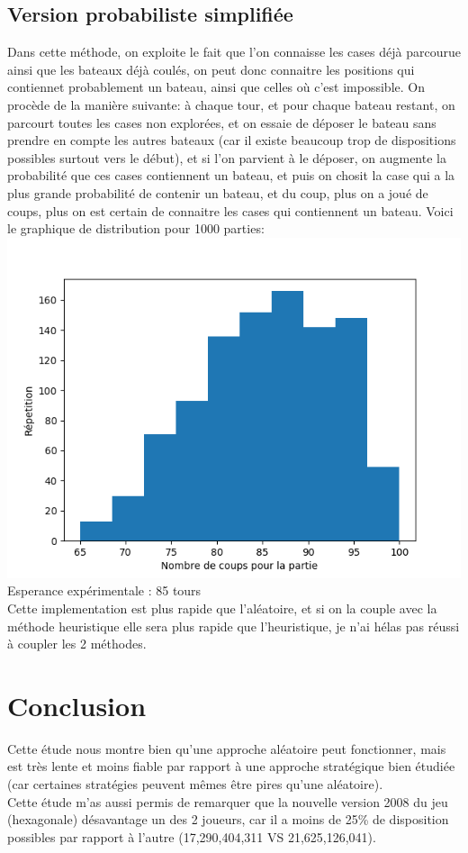 \documentclass[12pt]{article}
\begin{document}
    \subsection{Version probabiliste simplifiée}
    Dans cette méthode, on exploite le fait que l'on connaisse les cases déjà parcourue ainsi que les bateaux déjà coulés, on peut donc connaitre les positions qui contiennet probablement un bateau, ainsi que celles où c'est impossible.
    On procède de la manière suivante: à chaque tour, et pour chaque bateau restant, on parcourt toutes les cases non explorées, et on essaie de déposer le bateau sans prendre en compte les autres bateaux (car il existe beaucoup trop de dispositions possibles surtout vers le début), et si l'on parvient à le déposer, on augmente la probabilité que ces cases contiennent un bateau, et puis on chosit la case qui a la plus grande probabilité de contenir un bateau, et du coup, plus on a joué de coups, plus on est certain de connaitre les cases qui contiennent un bateau.
    Voici le graphique de distribution pour 1000 parties: \\
    \includegraphics{Proba.png}            
    \\Esperance expérimentale : 85 tours \\
    Cette implementation est plus rapide que l'aléatoire, et si on la couple avec la méthode heuristique elle sera plus rapide que l'heuristique, je n'ai hélas pas réussi à coupler les 2 méthodes.

\section{Conclusion}
    Cette étude nous montre bien qu'une approche aléatoire peut fonctionner, mais est très lente et moins fiable par rapport à une approche stratégique bien étudiée (car certaines stratégies peuvent mêmes être pires qu'une aléatoire).
    \\Cette étude m'as aussi permis de remarquer que la nouvelle version 2008 du jeu (hexagonale) désavantage un des 2 joueurs, car il a moins de 25\% de disposition possibles par rapport à l'autre (17,290,404,311 VS 21,625,126,041).
    

 
\end{document}
